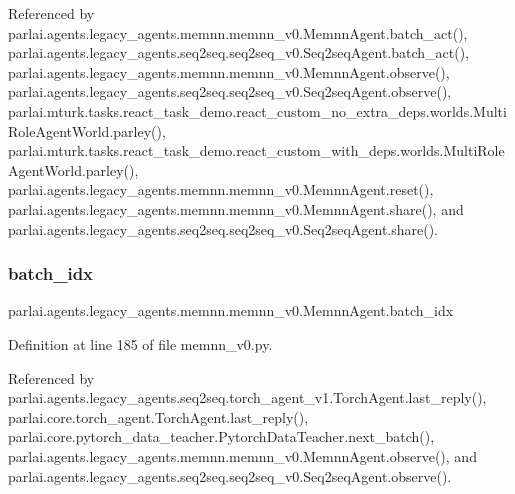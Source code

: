 Referenced by parlai.\+agents.\+legacy\+\_\+agents.\+memnn.\+memnn\+\_\+v0.\+Memnn\+Agent.\+batch\+\_\+act(), parlai.\+agents.\+legacy\+\_\+agents.\+seq2seq.\+seq2seq\+\_\+v0.\+Seq2seq\+Agent.\+batch\+\_\+act(), parlai.\+agents.\+legacy\+\_\+agents.\+memnn.\+memnn\+\_\+v0.\+Memnn\+Agent.\+observe(), parlai.\+agents.\+legacy\+\_\+agents.\+seq2seq.\+seq2seq\+\_\+v0.\+Seq2seq\+Agent.\+observe(), parlai.\+mturk.\+tasks.\+react\+\_\+task\+\_\+demo.\+react\+\_\+custom\+\_\+no\+\_\+extra\+\_\+deps.\+worlds.\+Multi\+Role\+Agent\+World.\+parley(), parlai.\+mturk.\+tasks.\+react\+\_\+task\+\_\+demo.\+react\+\_\+custom\+\_\+with\+\_\+deps.\+worlds.\+Multi\+Role\+Agent\+World.\+parley(), parlai.\+agents.\+legacy\+\_\+agents.\+memnn.\+memnn\+\_\+v0.\+Memnn\+Agent.\+reset(), parlai.\+agents.\+legacy\+\_\+agents.\+memnn.\+memnn\+\_\+v0.\+Memnn\+Agent.\+share(), and parlai.\+agents.\+legacy\+\_\+agents.\+seq2seq.\+seq2seq\+\_\+v0.\+Seq2seq\+Agent.\+share().

\mbox{\label{classparlai_1_1agents_1_1legacy__agents_1_1memnn_1_1memnn__v0_1_1MemnnAgent_a760f59a2f18c3132341cfc6737365c1f}} 
\subsubsection{\texorpdfstring{batch\+\_\+idx}{batch\_idx}}
{\footnotesize\ttfamily parlai.\+agents.\+legacy\+\_\+agents.\+memnn.\+memnn\+\_\+v0.\+Memnn\+Agent.\+batch\+\_\+idx}



Definition at line 185 of file memnn\+\_\+v0.\+py.



Referenced by parlai.\+agents.\+legacy\+\_\+agents.\+seq2seq.\+torch\+\_\+agent\+\_\+v1.\+Torch\+Agent.\+last\+\_\+reply(), parlai.\+core.\+torch\+\_\+agent.\+Torch\+Agent.\+last\+\_\+reply(), parlai.\+core.\+pytorch\+\_\+data\+\_\+teacher.\+Pytorch\+Data\+Teacher.\+next\+\_\+batch(), parlai.\+agents.\+legacy\+\_\+agents.\+memnn.\+memnn\+\_\+v0.\+Memnn\+Agent.\+observe(), and parlai.\+agents.\+legacy\+\_\+agents.\+seq2seq.\+seq2seq\+\_\+v0.\+Seq2seq\+Agent.\+observe().

